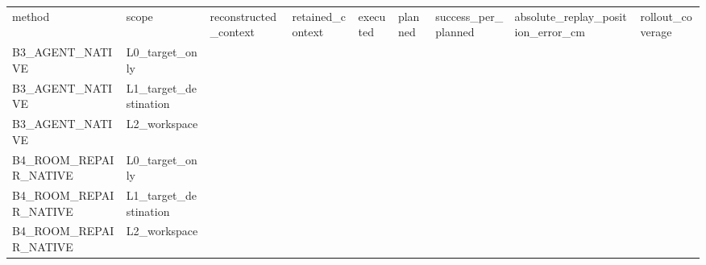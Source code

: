 \begin{tabular}{lllllllll}
method & scope & reconstructed\_context & retained\_context & executed & planned & success\_per\_planned & absolute\_replay\_position\_error\_cm & rollout\_coverage \\
B3\_AGENT\_NATIVE & L0\_target\_only &  &  &  &  &  &  &  \\
B3\_AGENT\_NATIVE & L1\_target\_destination &  &  &  &  &  &  &  \\
B3\_AGENT\_NATIVE & L2\_workspace &  &  &  &  &  &  &  \\
B4\_ROOM\_REPAIR\_NATIVE & L0\_target\_only &  &  &  &  &  &  &  \\
B4\_ROOM\_REPAIR\_NATIVE & L1\_target\_destination &  &  &  &  &  &  &  \\
B4\_ROOM\_REPAIR\_NATIVE & L2\_workspace &  &  &  &  &  &  &  \\
\end{tabular}
